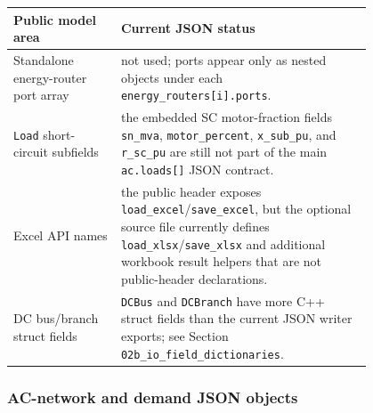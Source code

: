 \begin{longtable}{L{0.24\linewidth}L{0.56\linewidth}}
\toprule
Public model area & Current JSON status \\
\midrule
\endhead
Standalone energy-router port array & not used; ports appear only as nested objects under each \texttt{energy\_routers[i].ports}. \\
\texttt{Load} short-circuit subfields & the embedded SC motor-fraction fields \texttt{sn\_mva}, \texttt{motor\_percent}, \texttt{x\_sub\_pu}, and \texttt{r\_sc\_pu} are still not part of the main \texttt{ac.loads[]} JSON contract. \\
Excel API names & the public header exposes \texttt{load\_excel}/\texttt{save\_excel}, but the optional source file currently defines \texttt{load\_xlsx}/\texttt{save\_xlsx} and additional workbook result helpers that are not public-header declarations. \\
DC bus/branch struct fields & \texttt{DCBus} and \texttt{DCBranch} have more C++ struct fields than the current JSON writer exports; see Section \texttt{02b\_io\_field\_dictionaries}. \\
\bottomrule
\end{longtable}

\subsubsection*{AC-network and demand JSON objects}

